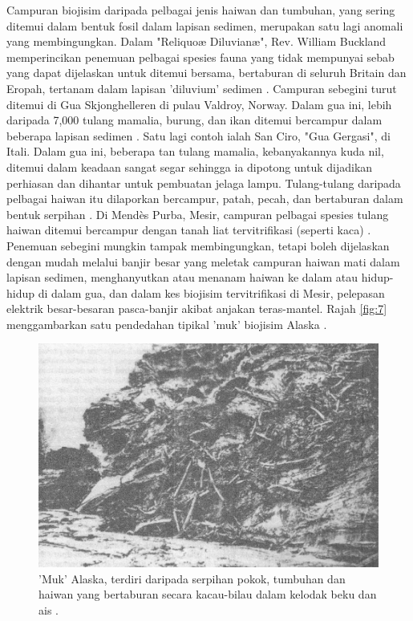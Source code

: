 \documentclass[10pt,twocolumn,letterpaper]{article}
\begin{document}
Campuran biojisim daripada pelbagai jenis haiwan dan tumbuhan, yang sering ditemui dalam bentuk fosil dalam lapisan sedimen, merupakan satu lagi anomali yang membingungkan. Dalam "Reliquoæ Diluvianæ", Rev. William Buckland memperincikan penemuan pelbagai spesies fauna yang tidak mempunyai sebab yang dapat dijelaskan untuk ditemui bersama, bertaburan di seluruh Britain dan Eropah, tertanam dalam lapisan 'diluvium' sedimen \cite{58}. Campuran sebegini turut ditemui di Gua Skjonghelleren di pulau Valdroy, Norway. Dalam gua ini, lebih daripada 7,000 tulang mamalia, burung, dan ikan ditemui bercampur dalam beberapa lapisan sedimen \cite{59}. Satu lagi contoh ialah San Ciro, "Gua Gergasi", di Itali. Dalam gua ini, beberapa tan tulang mamalia, kebanyakannya kuda nil, ditemui dalam keadaan sangat segar sehingga ia dipotong untuk dijadikan perhiasan dan dihantar untuk pembuatan jelaga lampu. Tulang-tulang daripada pelbagai haiwan itu dilaporkan bercampur, patah, pecah, dan bertaburan dalam bentuk serpihan \cite{60,61}. Di Mendès Purba, Mesir, campuran pelbagai spesies tulang haiwan ditemui bercampur dengan tanah liat tervitrifikasi (seperti kaca) \cite{57}. Penemuan sebegini mungkin tampak membingungkan, tetapi boleh dijelaskan dengan mudah melalui banjir besar yang meletak campuran haiwan mati dalam lapisan sedimen, menghanyutkan atau menanam haiwan ke dalam atau hidup-hidup di dalam gua, dan dalam kes biojisim tervitrifikasi di Mesir, pelepasan elektrik besar-besaran pasca-banjir akibat anjakan teras-mantel. Rajah \ref{fig:7} menggambarkan satu pendedahan tipikal 'muk' biojisim Alaska \cite{56}.

\begin{figure}[t]
\begin{center}
   \includegraphics[width=1\linewidth]{muck-crop.jpeg}
\end{center}
   \caption{'Muk' Alaska, terdiri daripada serpihan pokok, tumbuhan dan haiwan yang bertaburan secara kacau-bilau dalam kelodak beku dan ais \cite{146}.}
\label{fig:7}
\label{fig:onecol}
\end{figure}
\end{document}
